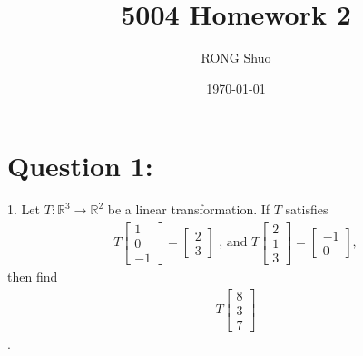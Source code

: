 \documentclass[a4paper,12pt]{article}
\newcommand{\R}{\mathbb{R}}
\begin{document}
\title{5004 Homework 2}
\author{RONG Shuo}
\date{\today}
\maketitle


\section*{Question 1:}
1. Let \(T: \R^3 \to \R^2\) be a linear transformation. If \(T\) satisfies 
\begin{align*}
    T\begin{bmatrix}
        1 \\
        0 \\
        -1 
    \end{bmatrix} = \begin{bmatrix}
        2 \\
        3 
    \end{bmatrix}
    \text{ , and }  
    T\begin{bmatrix}
        2 \\
        1 \\
        3
    \end{bmatrix} = \begin{bmatrix}
        -1 \\
        0
    \end{bmatrix},
\end{align*} then find 
\begin{align*}
    T\begin{bmatrix}
        8 \\
        3 \\
        7
    \end{bmatrix}
\end{align*}.
\end{document}
